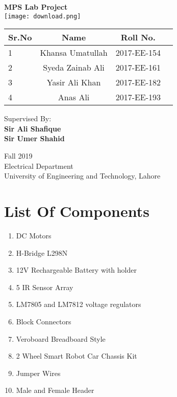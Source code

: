 \documentclass[12pt]{article}
\begin{document}
\begin{center}
\textbf{{\huge MPS Lab Project}}\\
\bigbreak
\bigbreak
\bigbreak
\texttt{[image: download.png]}\\
\bigbreak
\bigbreak
\bigbreak
\begin{tabular}{|l|c|c|r|}
\hline
\textbf {Sr.No} & \textbf Name  &\textbf{ Roll No.} \\
\hline
1 & Khansa Umatullah & 2017-EE-154 \\
2 & Syeda Zainab Ali & 2017-EE-161 \\
3 & Yasir Ali Khan & 2017-EE-182 \\
4 & Anas Ali & 2017-EE-193\\
\hline
\end{tabular}
\bigbreak
\bigbreak
\bigbreak
\bigbreak
\bigbreak
\bigbreak
\bigbreak
Supervised By:\\
\textbf{
Sir Ali Shafique\\
Sir Umer Shahid}

\bigbreak
\bigbreak
\bigbreak
\bigbreak
\bigbreak
\bigbreak
\bigbreak
\bigbreak
\bigbreak
Fall 2019\\
Electrical Department\\
University of Engineering and Technology, Lahore\\
\end{center}

\newpage
\section{List Of Components}
\begin{enumerate}
\item DC Motors
\item H-Bridge L298N
\item 12V Rechargeable Battery with holder
\item 5 IR Sensor Array
\item LM7805 and LM7812 voltage regulators
\item Block Connectors
\item Veroboard Breadboard Style
\item 2 Wheel Smart Robot Car Chassis Kit
\item Jumper Wires
\item Male and Female Header
\end{enumerate}
\bigbreak

\newpage
\end{document}
